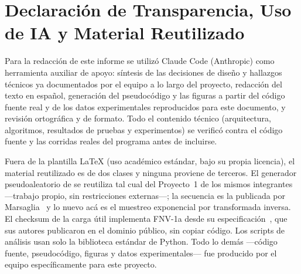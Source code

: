 \section*{Declaración de Transparencia, Uso de IA y Material Reutilizado}

Para la redacción de este informe se utilizó Claude Code (Anthropic) como
herramienta auxiliar de apoyo: síntesis de las decisiones de diseño y
hallazgos técnicos ya documentados por el equipo a lo largo del proyecto,
redacción del texto en español, generación del pseudocódigo y las figuras a
partir del código fuente real y de los datos experimentales reproducidos
para este documento, y revisión ortográfica y de formato. Todo el contenido
técnico (arquitectura, algoritmos, resultados de pruebas y experimentos) se
verificó contra el código fuente y las corridas reales del programa antes
de incluirse.

Fuera de la plantilla LaTeX  (uso académico estándar, bajo su
propia licencia), el material reutilizado es de dos clases y ninguna
proviene de terceros. El generador pseudoaleatorio  de
 se reutiliza tal cual del Proyecto~1 de los mismos
integrantes ---trabajo propio, sin restricciones externas---; la secuencia es
la publicada por Marsaglia~\cite{Marsaglia2003} y lo nuevo acá es el
muestreo exponencial por transformada inversa. El checksum de la carga útil
implementa FNV-1a desde su especificación~\cite{FNV}, que sus autores
publicaron en el dominio público, sin copiar código. Los scripts de análisis
usan solo la biblioteca estándar de Python. Todo lo demás ---código fuente,
pseudocódigo, figuras y datos experimentales--- fue producido por el equipo
específicamente para este proyecto.
